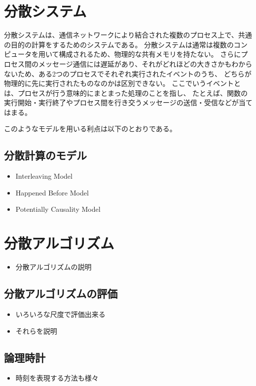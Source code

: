 \section{分散システム}\label{ux5206ux6563ux30b7ux30b9ux30c6ux30e0}

分散システムは、通信ネットワークにより結合された複数のプロセス上で、共通の目的の計算をするためのシステムである。
分散システムは通常は複数のコンピュータを用いて構成されるため、物理的な共有メモリを持たない。
さらにプロセス間のメッセージ通信には遅延があり、それがどれほどの大きさかもわからないため、ある2つのプロセスでそれぞれ実行されたイベントのうち、
どちらが物理的に先に実行されたものなのかは区別できない。
ここでいうイベントとは、プロセスが行う意味的にまとまった処理のことを指し、
たとえば、関数の実行開始・実行終了やプロセス間を行き交うメッセージの送信・受信などが当てはまる。

このようなモデルを用いる利点は以下のとおりである。

\subsection{分散計算のモデル}\label{ux5206ux6563ux8a08ux7b97ux306eux30e2ux30c7ux30eb}

\begin{itemize}
\tightlist
\item
  Interleaving Model
\item
  Happened Before Model
\item
  Potentially Causality Model
\end{itemize}

\section{分散アルゴリズム}\label{ux5206ux6563ux30a2ux30ebux30b4ux30eaux30baux30e0}

\begin{itemize}
\tightlist
\item
  分散アルゴリズムの説明
\end{itemize}

\subsection{分散アルゴリズムの評価}\label{ux5206ux6563ux30a2ux30ebux30b4ux30eaux30baux30e0ux306eux8a55ux4fa1}

\begin{itemize}
\tightlist
\item
  いろいろな尺度で評価出来る
\item
  それらを説明
\end{itemize}

\subsection{論理時計}\label{ux8ad6ux7406ux6642ux8a08}

\begin{itemize}
\tightlist
\item
  時刻を表現する方法も様々
\end{itemize}

